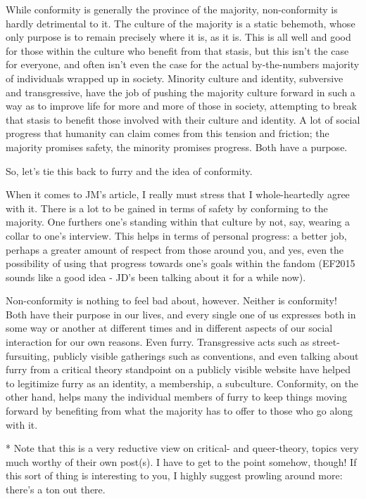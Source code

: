 While conformity is generally the province of the majority, non-conformity is hardly detrimental to it. The culture of the majority is a static behemoth, whose only purpose is to remain precisely where it is, as it is. This is all well and good for those within the culture who benefit from that stasis, but this isn't the case for everyone, and often isn't even the case for the actual by-the-numbers majority of individuals wrapped up in society. Minority culture and identity, subversive and transgressive, have the job of pushing the majority culture forward in such a way as to improve life for more and more of those in society, attempting to break that stasis to benefit those involved with their culture and identity. A lot of social progress that humanity can claim comes from this tension and friction; the majority promises safety, the minority promises progress. Both have a purpose.

So, let's tie this back to furry and the idea of conformity.

When it comes to JM's article, I really must stress that I whole-heartedly agree with it. There is a lot to be gained in terms of safety by conforming to the majority. One furthers one's standing within that culture by not, say, wearing a collar to one's interview. This helps in terms of personal progress: a better job, perhaps a greater amount of respect from those around you, and yes, even the possibility of using that progress towards one's goals within the fandom (EF2015 sounds like a good idea - JD's been talking about it for a while now).

Non-conformity is nothing to feel bad about, however. Neither is conformity! Both have their purpose in our lives, and every single one of us expresses both in some way or another at different times and in different aspects of our social interaction for our own reasons. Even furry. Transgressive acts such as street-fursuiting, publicly visible gatherings such as conventions, and even talking about furry from a critical theory standpoint on a publicly visible website have helped to legitimize furry as an identity, a membership, a subculture. Conformity, on the other hand, helps many the individual members of furry to keep things moving forward by benefiting from what the majority has to offer to those who go along with it.

* Note that this is a very reductive view on critical- and queer-theory, topics very much worthy of their own post(s). I have to get to the point somehow, though! If this sort of thing is interesting to you, I highly suggest prowling around more: there's a ton out there.
